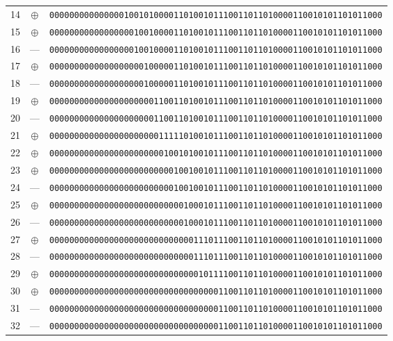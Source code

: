 \documentclass[11pt,a4paper]{article}
\begin{document}
\begin{center}
\begin{tabular}{rcl}
    14 & $\oplus$ & \texttt{0000000000000001001010000110100101110011011010000110010101101011000} \\
    15 & $\oplus$ & \texttt{0000000000000000010010000110100101110011011010000110010101101011000} \\
    16 & --- & \texttt{0000000000000000010010000110100101110011011010000110010101101011000} \\
    17 & $\oplus$ & \texttt{0000000000000000000100000110100101110011011010000110010101101011000} \\
    18 & --- & \texttt{0000000000000000000100000110100101110011011010000110010101101011000} \\
    19 & $\oplus$ & \texttt{0000000000000000000001100110100101110011011010000110010101101011000} \\
    20 & --- & \texttt{0000000000000000000001100110100101110011011010000110010101101011000} \\
    21 & $\oplus$ & \texttt{0000000000000000000000111110100101110011011010000110010101101011000} \\
    22 & $\oplus$ & \texttt{0000000000000000000000010010100101110011011010000110010101101011000} \\
    23 & $\oplus$ & \texttt{0000000000000000000000000100100101110011011010000110010101101011000} \\
    24 & --- & \texttt{0000000000000000000000000100100101110011011010000110010101101011000} \\
    25 & $\oplus$ & \texttt{0000000000000000000000000001000101110011011010000110010101101011000} \\
    26 & --- & \texttt{0000000000000000000000000001000101110011011010000110010101101011000} \\
    27 & $\oplus$ & \texttt{0000000000000000000000000000011101110011011010000110010101101011000} \\
    28 & --- & \texttt{0000000000000000000000000000011101110011011010000110010101101011000} \\
    29 & $\oplus$ & \texttt{0000000000000000000000000000001011110011011010000110010101101011000} \\
    30 & $\oplus$ & \texttt{0000000000000000000000000000000000110011011010000110010101101011000} \\
    31 & --- & \texttt{0000000000000000000000000000000000110011011010000110010101101011000} \\
    32 & --- & \texttt{0000000000000000000000000000000000110011011010000110010101101011000} \\

\end{tabular}
\end{center}
\end{document}
